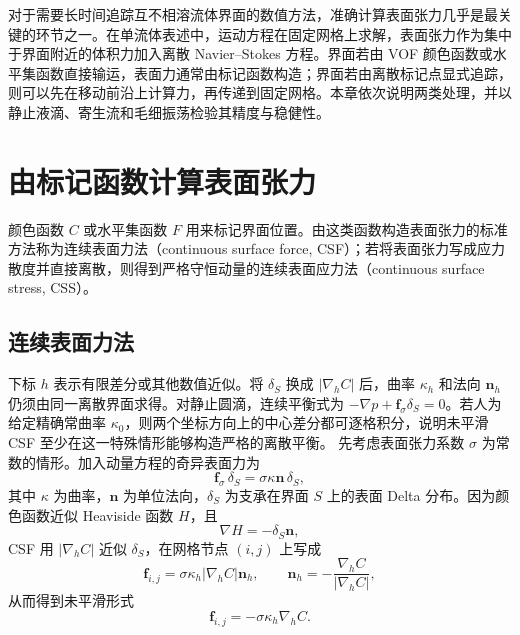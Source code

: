 \documentclass[11pt,a4paper,openany,fontset=none]{ctexbook}
\begin{document}
对于需要长时间追踪互不相溶流体界面的数值方法，准确计算表面张力几乎是最关键的环节之一。在单流体表述中，运动方程在固定网格上求解，表面张力作为集中于界面附近的体积力加入离散 Navier--Stokes 方程。界面若由 VOF 颜色函数或水平集函数直接输运，表面力通常由标记函数构造；界面若由离散标记点显式追踪，则可以先在移动前沿上计算力，再传递到固定网格。本章依次说明两类处理，并以静止液滴、寄生流和毛细振荡检验其精度与稳健性。

\section{由标记函数计算表面张力}

颜色函数 $C$ 或水平集函数 $F$ 用来标记界面位置。由这类函数构造表面张力的标准方法称为连续表面力法（continuous surface force, CSF）；若将表面张力写成应力散度并直接离散，则得到严格守恒动量的连续表面应力法（continuous surface stress, CSS）。

\subsection{连续表面力法}

下标 $h$ 表示有限差分或其他数值近似。将 $\delta_S$ 换成 $|\nabla_hC|$ 后，曲率 $\kappa_h$ 和法向 $\boldsymbol n_h$ 仍须由同一离散界面求得。对静止圆滴，连续平衡式为 $-\nabla p+\boldsymbol f_\sigma\delta_S=0$。若人为给定精确常曲率 $\kappa_0$，则两个坐标方向上的中心差分都可逐格积分，说明未平滑 CSF 至少在这一特殊情形能够构造严格的离散平衡。
先考虑表面张力系数 $\sigma$ 为常数的情形。加入动量方程的奇异表面力为
\begin{equation}
  \boldsymbol f_\sigma\,\delta_S
  =\sigma\kappa\boldsymbol n\,\delta_S,
  \tag{7.1}
\end{equation}
其中 $\kappa$ 为曲率，$\boldsymbol n$ 为单位法向，$\delta_S$ 为支承在界面 $S$ 上的表面 Delta 分布。因为颜色函数近似 Heaviside 函数 $H$，且
\begin{equation}
  \nabla H=-\delta_S\boldsymbol n,
  \tag{7.2}
\end{equation}
CSF 用 $|\nabla_h C|$ 近似 $\delta_S$，在网格节点 $(i,j)$ 上写成
\begin{equation}
  \boldsymbol f_{i,j}=\sigma\kappa_h|\nabla_h C|\boldsymbol n_h,
  \qquad
  \boldsymbol n_h=-\frac{\nabla_hC}{|\nabla_hC|},
  \tag{7.3--7.4}
\end{equation}
从而得到未平滑形式
\begin{equation}
  \boldsymbol f_{i,j}=-\sigma\kappa_h\nabla_hC.
  \tag{7.5}
\end{equation}
\end{document}
